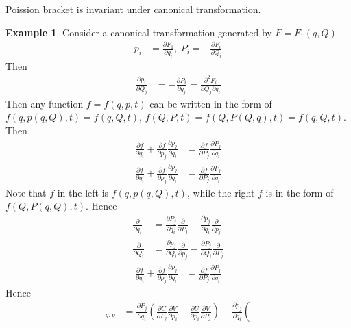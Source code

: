 \documentclass[twoside,9pt]{article}
\numberwithin{equation}{section} %
\newcommand{\lms}{\fontfamily{lmss}\selectfont} %
\theoremstyle{definition}
\newtheorem{example}{\lms Example}[section]
\theoremstyle{remark}
\begin{document}
Poission bracket is invariant under canonical transformation.
\begin{example}
Consider a canonical transformation generated by $F=F_1(q, Q)$
\begin{align*}
    p_i &= \frac{\partial F_1}{\partial q_i},~
    P_i = -\frac{\partial F_i}{\partial Q_i}
\end{align*}
Then
\begin{align*}
    \frac{\partial p_i}{\partial Q_j} &=
    -\frac{\partial P_i}{\partial q_j} = 
    \frac{\partial^2 F_i}{\partial Q_j\partial q_i}
\end{align*}
Then any function $f=f(q,p,t)$ can be written in the form of
$f(q,p(q, Q), t) = f(q, Q, t)$,
$f(Q, P, t) = f(Q, P(Q, q), t) = f(q, Q, t)$.
Then
\begin{align*}
\frac{\partial f}{\partial q_i} + 
    \frac{\partial f}{\partial p_j}
    \frac{\partial p_j}{\partial q_i}
    &= 
    \frac{\partial f}{\partial P_j}
    \frac{\partial P_j}{\partial q_i}
\end{align*}
\begin{align*}
    \frac{\partial f}{\partial q_i} + 
    \frac{\partial f}{\partial p_j}
    \frac{\partial p_j}{\partial q_i}
    &= 
    \frac{\partial f}{\partial P_j}
    \frac{\partial P_j}{\partial q_i}
\end{align*}
Note that $f$ in the left is $f(q, p(q, Q), t)$,
while the right $f$ is in the form of $f(Q, P(q, Q), t)$.
Hence
\begin{align*}
    \frac{\partial }{\partial q_i} &=
    \frac{\partial P_j}{\partial q_i}\frac{\partial }{\partial P_j}
    - \frac{\partial p_j}{\partial q_i}\frac{\partial}{\partial p_j}\\
    \frac{\partial }{\partial Q_i} &=
    \frac{\partial p_j}{\partial Q_i}\frac{\partial }{\partial p_j}
    - \frac{\partial P_j}{\partial Q_i}\frac{\partial}{\partial P_j}
\end{align*}
\begin{align*}
\frac{\partial f}{\partial q_i} + 
    \frac{\partial f}{\partial p_j}
    \frac{\partial p_j}{\partial q_i}
    &= 
    \frac{\partial f}{\partial P_j}
    \frac{\partial P_j}{\partial q_i}
\end{align*}
Hence 
\begin{align*}
    [U, V]_{q,p} &= 
    \frac{\partial P_j}{\partial q_i}\left( 
        \frac{\partial U}{\partial P_j}\frac{\partial V}{\partial p_i}-
        \frac{\partial U}{\partial p_i}\frac{\partial V}{\partial P_j}
    \right)
    + 
    \frac{\partial p_j}{\partial q_i}\left( 

\end{align*}
\end{example}
\end{document}
